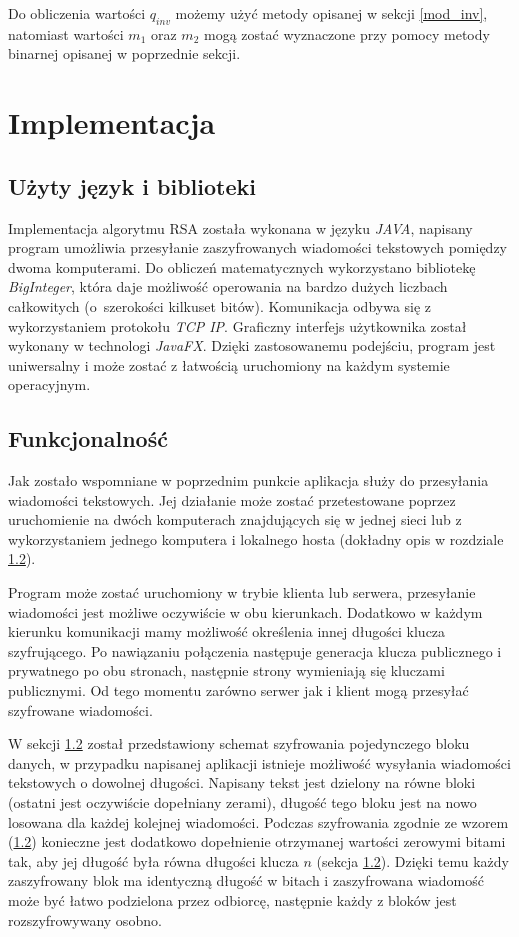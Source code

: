 \documentclass[10pt,a4paper]{article}
\begin{document}
Do obliczenia wartości $q_{inv}$ możemy użyć metody opisanej w sekcji \ref{mod_inv}, natomiast wartości $m_1$ oraz $m_2$ mogą zostać wyznaczone przy pomocy metody binarnej opisanej w poprzednie sekcji.

\section{Implementacja}
\subsection{Użyty język i biblioteki}

Implementacja algorytmu RSA została wykonana w języku \textit{JAVA}, napisany program umożliwia przesyłanie zaszyfrowanych wiadomości tekstowych pomiędzy dwoma komputerami. Do obliczeń matematycznych wykorzystano bibliotekę \textit{BigInteger}, która daje możliwość operowania na bardzo dużych liczbach całkowitych (o~szerokości kilkuset bitów). Komunikacja odbywa się z wykorzystaniem protokołu \textit{TCP IP}. Graficzny interfejs użytkownika został wykonany w technologi \textit{JavaFX}. Dzięki zastosowanemu podejściu, program jest uniwersalny i może zostać z łatwością uruchomiony na każdym systemie operacyjnym. 

\subsection{Funkcjonalność}

Jak zostało wspomniane w poprzednim punkcie aplikacja służy do przesyłania wiadomości tekstowych. Jej działanie może zostać przetestowane poprzez uruchomienie na dwóch komputerach znajdujących się w jednej sieci lub z wykorzystaniem jednego komputera i lokalnego hosta (dokładny opis w rozdziale \ref{}). 

Program może zostać uruchomiony w trybie klienta lub serwera, przesyłanie wiadomości jest możliwe oczywiście w obu kierunkach. Dodatkowo w każdym kierunku komunikacji mamy możliwość określenia innej długości klucza szyfrującego. Po nawiązaniu połączenia następuje generacja klucza publicznego i prywatnego po obu stronach, następnie strony wymieniają się kluczami publicznymi. Od tego momentu zarówno serwer jak i klient mogą przesyłać szyfrowane wiadomości. 

W sekcji \ref{} został przedstawiony schemat szyfrowania pojedynczego bloku danych, w przypadku napisanej aplikacji istnieje możliwość wysyłania wiadomości tekstowych o dowolnej długości. Napisany tekst jest dzielony na równe bloki (ostatni jest oczywiście dopełniany zerami), długość tego bloku jest na nowo losowana dla każdej kolejnej wiadomości. Podczas szyfrowania zgodnie ze wzorem (\ref{}) konieczne jest dodatkowo dopełnienie otrzymanej wartości zerowymi bitami tak, aby jej długość była równa długości klucza $n$ (sekcja \ref{}). Dzięki temu każdy zaszyfrowany blok ma identyczną długość w bitach i zaszyfrowana wiadomość może być łatwo podzielona przez odbiorcę, następnie każdy z bloków jest rozszyfrowywany osobno.
\end{document}
